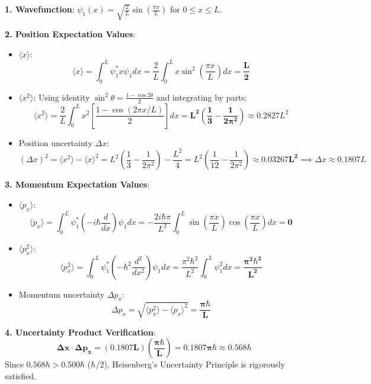 \begin{theorysol}
\textbf{1. Wavefunction}:
$\psi_1(x) = \sqrt{\frac{2}{L}}\sin\left(\frac{\pi x}{L}\right)$ for $0 \le x \le L$.

\textbf{2. Position Expectation Values}:
\begin{itemize}
    \item $\langle x \rangle$:
    \begin{equation}
    \langle x \rangle = \int_0^L \psi_1^* x \psi_1 dx = \frac{2}{L}\int_0^L x \sin^2\left(\frac{\pi x}{L}\right)dx = \mathbf{\frac{L}{2}}
    \end{equation}
    \item $\langle x^2 \rangle$:
    Using identity $\sin^2\theta = \frac{1-\cos 2\theta}{2}$ and integrating by parts:
    \begin{equation}
    \langle x^2 \rangle = \frac{2}{L}\int_0^L x^2 \left[\frac{1 - \cos(2\pi x/L)}{2}\right]dx = \mathbf{L^2 \left( \frac{1}{3} - \frac{1}{2\pi^2} \right)} \approx 0.2827 L^2
    \end{equation}
    \item Position uncertainty $\Delta x$:
    \begin{equation}
    (\Delta x)^2 = \langle x^2 \rangle - \langle x \rangle^2 = L^2\left(\frac{1}{3} - \frac{1}{2\pi^2}\right) - \frac{L^2}{4} = L^2\left(\frac{1}{12} - \frac{1}{2\pi^2}\right) \approx \mathbf{0.03267 L^2} \implies \Delta x \approx 0.1807 L
    \end{equation}
\end{itemize}

\textbf{3. Momentum Expectation Values}:
\begin{itemize}
    \item $\langle p_x \rangle$:
    \begin{equation}
    \langle p_x \rangle = \int_0^L \psi_1^* \left(-i\hbar\frac{d}{dx}\right)\psi_1 dx = -\frac{2i\hbar\pi}{L^2}\int_0^L \sin\left(\frac{\pi x}{L}\right)\cos\left(\frac{\pi x}{L}\right)dx = \mathbf{0}
    \end{equation}
    \item $\langle p_x^2 \rangle$:
    \begin{equation}
    \langle p_x^2 \rangle = \int_0^L \psi_1^* \left(-\hbar^2\frac{d^2}{dx^2}\right)\psi_1 dx = \frac{\pi^2\hbar^2}{L^2}\int_0^L \psi_1^2 dx = \mathbf{\frac{\pi^2\hbar^2}{L^2}}
    \end{equation}
    \item Momentum uncertainty $\Delta p_x$:
    \begin{equation}
    \Delta p_x = \sqrt{\langle p_x^2 \rangle - \langle p_x \rangle^2} = \mathbf{\frac{\pi\hbar}{L}}
    \end{equation}
\end{itemize}

\textbf{4. Uncertainty Product Verification}:
\begin{equation}
\mathbf{\Delta x \cdot \Delta p_x = (0.1807 L)\left(\frac{\pi\hbar}{L}\right) = 0.1807 \pi \hbar \approx 0.568 \hbar}
\end{equation}
Since $0.568\hbar > 0.500\hbar$ ($\hbar/2$), Heisenberg's Uncertainty Principle is rigorously satisfied.
\end{theorysol}
